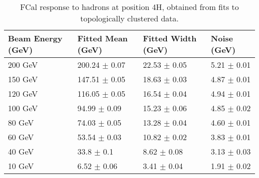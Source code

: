 \begin{table}
\begin{center}
\begin{tabular}[!htb]{|l|l|l|l|}
\hline
Beam Energy (GeV) & Fitted Mean (GeV)& Fitted Width (GeV)& Noise (GeV) \\
\hline
200 GeV  &  200.24 $\pm$    0.07 &   22.53 $\pm$    0.05 &    5.21 $\pm$    0.01 \\
150 GeV  &  147.51 $\pm$    0.05 &   18.63 $\pm$    0.03 &    4.87 $\pm$    0.01 \\
120 GeV  &  116.05 $\pm$    0.05 &   16.54 $\pm$    0.04 &    4.94 $\pm$    0.01 \\
100 GeV  &   94.99 $\pm$    0.09 &   15.23 $\pm$    0.06 &    4.85 $\pm$    0.02 \\
 80 GeV  &   74.03 $\pm$    0.05 &   13.28 $\pm$    0.04 &    4.60 $\pm$    0.01 \\
 60 GeV  &   53.54 $\pm$    0.03 &   10.82 $\pm$    0.02 &    3.83 $\pm$    0.01 \\
 40 GeV  &   33.8  $\pm$    0.1  &    8.62 $\pm$    0.08 &    3.13 $\pm$    0.03 \\
 10 GeV  &    6.52 $\pm$    0.06 &    3.41 $\pm$    0.04 &    1.91 $\pm$    0.02 \\

\hline
\end{tabular}
\caption[4H Response to hadrons, topoclusters]{FCal response to hadrons at position 4H, obtained from fits to topologically clustered data.}
\label{table_hadron_response_t420_4H}
\end{center}
\end{table}

